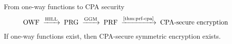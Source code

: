 \begin{framedcor}{From one-way functions to CPA security}
  \[
    \text{OWF} \;\xrightarrow{\text{HILL}}\; \text{PRG} \;\xrightarrow{\text{GGM}}\; \text{PRF} \;\xrightarrow{\text{\Cref{thm:prf-cpa}}}\; \text{CPA-secure encryption}
  \]
  If one-way functions exist, then CPA-secure symmetric encryption exists.
\end{framedcor}
